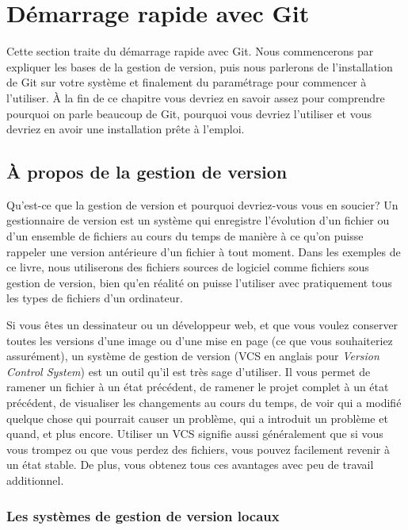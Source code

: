 \section{Démarrage rapide avec Git}
\label{sec:git:getting_started}

\begingroup
{}
\raggedbottom

Cette section traite du démarrage rapide avec Git.
Nous commencerons par expliquer les bases de la gestion de version, puis nous parlerons de l'installation de Git sur votre système et finalement du paramétrage pour commencer à l'utiliser.
À la fin de ce chapitre vous devriez en savoir assez pour comprendre pourquoi on parle beaucoup de Git, pourquoi vous devriez l'utiliser et vous devriez en avoir une installation prête à l'emploi.

\subsection{À propos de la gestion de version}

Qu'est-ce que la gestion de version et pourquoi devriez-vous vous en soucier?
Un gestionnaire de version est un système qui enregistre l'évolution d'un fichier ou d'un ensemble de fichiers au cours du temps de manière à ce qu'on puisse rappeler une version antérieure d'un fichier à tout moment.
Dans les exemples de ce livre, nous utiliserons des fichiers sources de logiciel comme fichiers sous gestion de version, bien qu'en réalité on puisse l'utiliser avec pratiquement tous les types de fichiers d'un ordinateur.

Si vous êtes un dessinateur ou un développeur web, et que vous voulez conserver toutes les versions d'une image ou d'une mise en page (ce que vous souhaiteriez assurément), un système de gestion de version (VCS en anglais pour \emph{Version Control System}) est un outil qu'il est très sage d'utiliser.
Il vous permet de ramener un fichier à un état précédent, de ramener le projet complet à un état précédent, de visualiser les changements au cours du temps, de voir qui a modifié quelque chose qui pourrait causer un problème, qui a introduit un problème et quand, et plus encore.
Utiliser un VCS signifie aussi généralement que si vous vous trompez ou que vous perdez des fichiers, vous pouvez facilement revenir à un état stable.
De plus, vous obtenez tous ces avantages avec peu de travail additionnel.

\subsubsection{Les systèmes de gestion de version locaux}

